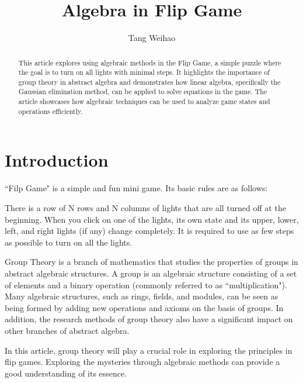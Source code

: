 \documentclass[
  manuscript=article,  %
  layout=preprint,  %
  year=20xx,
  volume=x,
]{extra/joas}
\title{Algebra in Flip Game}
\author{Tang Weihao}
\affiliation{Ningbo University, Ningbo, China}
\begin{document}
\begin{abstract}
  This article explores using algebraic methods in the Flip Game, 
  a simple puzzle where the goal is to turn on all lights with minimal steps. 
  It highlights the importance of group theory in abstract algebra and demonstrates how linear algebra, 
  specifically the Gaussian elimination method, can be applied to solve equations in the game. 
  The article showcases how algebraic techniques can be used to analyze game states and operations efficiently.
\end{abstract}


\section{Introduction}

``Filp Game" is a simple and fun mini game. Its basic rules are as follows:

There is a row of N rows and N columns of lights that are all turned off at the beginning. 
When you click on one of the lights, its own state and its upper, lower, left, and right lights (if any) change completely.
It is required to use as few steps as possible to turn on all the lights.

\par Group Theory is a branch of mathematics that studies the properties of groups
 in abstract algebraic structures. 
 A group is an algebraic structure consisting of a set of elements and a binary operation 
 (commonly referred to as ``multiplication").
 Many algebraic structures, such as rings, fields, and modules, 
 can be seen as being formed by adding new operations and axioms on the basis of groups. 
 In addition, the research methods of group theory also have a significant impact on other 
 branches of abstract algebra.

\par In this article, group theory will play a crucial role in exploring the principles in flip games.
 Exploring the mysteries through algebraic methods can provide a good understanding of its essence.
\end{document}
